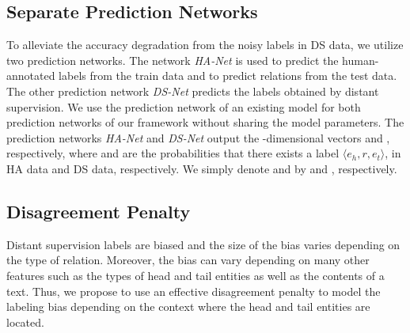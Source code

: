 \documentclass[11pt]{article}
\newcommand{\triple}[3]{\ensuremath{\langle #1,#2,#3\rangle}}
\newcommand{\hanet}{\emph{HA-Net}\xspace}
\newcommand{\dsnet}{\emph{DS-Net}\xspace}
\newcommand{\ehead}{e_{h}}
\newcommand{\etail}{e_{t}}
\begin{document}
\subsection{Separate Prediction Networks}
To alleviate the accuracy degradation from the noisy labels in DS data, we utilize two prediction networks.
The network \hanet is used to predict the human-annotated labels from the train data and to predict relations from the test data.
The other prediction network  \dsnet predicts the labels obtained by distant supervision.
We use the prediction network of an existing model for both prediction networks of our framework without sharing the model parameters.
The prediction networks \hanet and \dsnet output the -dimensional vectors   and  , respectively, where  and  are the probabilities that there exists a label \triple{\ehead}{r}{\etail}, in HA data and DS data, respectively. 
We simply denote  and  by  and , respectively.









\subsection{Disagreement Penalty}
Distant supervision labels are biased and the size of the bias varies depending on the type of relation.
Moreover, the bias can vary depending on many other features such as the types of head and tail entities as well as the contents of a text.
Thus, we propose to use an effective disagreement penalty to model the labeling bias depending on the context where the head and tail entities are located.
\end{document}
